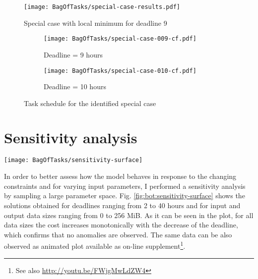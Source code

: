 {  \begin{figure}[tb]
     \centering \texttt{[image: BagOfTasks/special-case-results.pdf]}
     \caption{Special case with local minimum for deadline 9
     \label{fig:bot:special-case-results}}
  \end{figure}

  \begin{figure}[tb]
     \centering  
     \begin{subfigure}[b]{0.49\textwidth}
       \centering       
       \texttt{[image: BagOfTasks/special-case-009-cf.pdf]}
       \caption{Deadline = 9 hours}
       \label{fig:bot:special-case-009-cf}
     \end{subfigure}
     \begin{subfigure}[b]{0.49\textwidth}
       \centering       
       \texttt{[image: BagOfTasks/special-case-010-cf.pdf]}
       \caption{Deadline = 10 hours}
       \label{fig:bot:special-case-010-cf}
     \end{subfigure}
     \caption{Task schedule for the identified special case}
  \end{figure}
    
\section{Sensitivity analysis}
\label{sec:bot:sensitivity}
    
  \begin{figure*}[tb]
     \centering \texttt{[image: BagOfTasks/sensitivity-surface]}
     \caption{Optimal cost for a wide range of deadline constraints and data
     sizes.\label{fig:bot:sensitivity-surface}}
  \end{figure*} 
  
  In order to better assess how the model behaves in response to the changing
  constraints and for varying input parameters, I performed a sensitivity
  analysis by sampling a large parameter space.
  Fig. \ref{fig:bot:sensitivity-surface} shows the solutions obtained for deadlines
  ranging from 2 to 40 hours and for input and output data sizes ranging from
  0 to 256 MiB. As it can be seen in the plot, for all data sizes the cost
  increases monotonically with the decrease of the deadline, which confirms
  that no anomalies are observed. The same data can be also observed as
  animated plot available as on-line supplement\footnote{See also
  \url{http://youtu.be/FWjgMwLdZW4}}.
  
}
